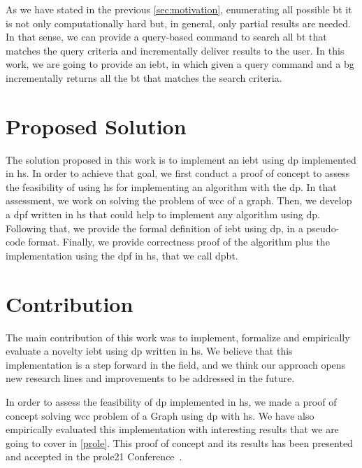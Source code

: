 As we have stated in the previous \autoref{sec:motivation}, enumerating all possible \acrshort{bt} it is not only computationally hard but, in general, only partial results are needed.
In that sense, we can provide a query-based command to search all \acrshort{bt} that matches the query criteria and incrementally deliver results to the user.
In this work, we are going to provide an \acrfull{iebt}, in which given a query command and a \acrlong{bg} incrementally returns all the \acrlong{bt} that matches the search criteria.

\section{Proposed Solution}
The solution proposed in this work is to implement an \acrfull{iebt} using \acrfull{dp} implemented in \acrfull{hs}.
In order to achieve that goal, we first conduct a proof of concept to assess the feasibility of using \acrshort{hs} for implementing an algorithm with the \acrshort{dp}.
In that assessment, we work on solving the problem of \acrfull{wcc} of a graph. Then, we develop a \acrlong{dpf} written in \acrlong{hs} that could help to implement any algorithm using \acrshort{dp}.
Following that, we provide the formal definition of \acrshort{iebt} using \acrshort{dp}, in a pseudo-code format. 
Finally, we provide correctness proof of the algorithm plus the implementation using the \acrshort{dpf} in \acrshort{hs}, that we call \acrfull{dpbt}.

\section{Contribution}\label{sec:contrib}
The main contribution of this work was to implement, formalize and empirically evaluate a novelty \acrlong{iebt} using \acrlong{dp} written in \acrshort{hs}.
We believe that this implementation is a step forward in the field, and we think our approach opens new research lines and improvements to be addressed in the future. 

In order to assess the feasibility of \acrshort{dp} implemented in \acrshort{hs}, we made a proof of concept solving \acrfull{wcc} problem of a Graph 
using \acrshort{dp} with \acrshort{hs}. We have also empirically evaluated this implementation with interesting results that we are going to cover in \autoref{prole}. 
This proof of concept and its results has been presented and accepted in the \acrfull{prole21} Conference~\cite{prole21}. 

